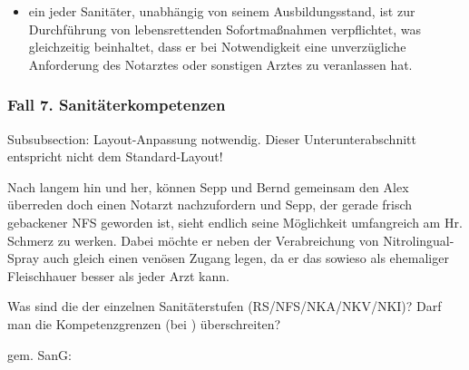
\begin{itemize}
    
    \item {\mdseries
    ein jeder Sanitäter, unabhängig von seinem Ausbildungsstand, ist zur
    Durchf\"uhrung von lebensrettenden Sofortma{\ss}nahmen verpflichtet,
    was gleichzeitig beinhaltet, dass er bei Notwendigkeit eine
    unverz\"ugliche Anforderung des Notarztes oder sonstigen Arztes zu
    veranlassen hat.}
    
\end{itemize}



\subsubsection{Fall 7. Sanitäterkompetenzen}
\begin{anfxwarning}[author=GABS]{Subsubsection: Layout-Anpassung notwendig.}
Dieser Unterunterabschnitt entspricht nicht dem Standard-Layout!
\end{anfxwarning}


Nach langem hin und her, k\"onnen Sepp und Bernd gemeinsam den Alex
\"uberreden doch einen Notarzt nachzufordern und Sepp, der gerade frisch
gebackener NFS geworden ist, sieht endlich seine M\"oglichkeit
umfangreich am Hr. Schmerz zu werken. Dabei m\"ochte er neben der
Verabreichung von Nitrolingual-Spray auch gleich einen ven\"osen Zugang
legen, da er das sowieso als ehemaliger Fleischhauer besser als jeder
Arzt kann.


Was sind die  der einzelnen Sanitäterstufen
(RS/NFS/NKA/NKV/NKI)? Darf man die Kompetenzgrenzen (bei ) \"uberschreiten?


 gem.  SanG:


